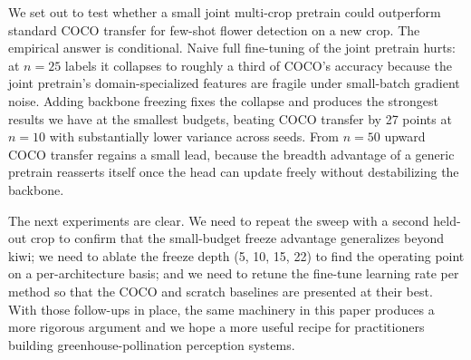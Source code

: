 We set out to test whether a small joint multi-crop pretrain could outperform standard COCO transfer for few-shot flower detection on a new crop. The empirical answer is conditional. Naive full fine-tuning of the joint pretrain hurts: at $n{=}25$ labels it collapses to roughly a third of COCO's accuracy because the joint pretrain's domain-specialized features are fragile under small-batch gradient noise. Adding backbone freezing fixes the collapse and produces the strongest results we have at the smallest budgets, beating COCO transfer by 27 points at $n{=}10$ with substantially lower variance across seeds. From $n{=}50$ upward COCO transfer regains a small lead, because the breadth advantage of a generic pretrain reasserts itself once the head can update freely without destabilizing the backbone.

The next experiments are clear. We need to repeat the sweep with a second held-out crop to confirm that the small-budget freeze advantage generalizes beyond kiwi; we need to ablate the freeze depth (5, 10, 15, 22) to find the operating point on a per-architecture basis; and we need to retune the fine-tune learning rate per method so that the COCO and scratch baselines are presented at their best. With those follow-ups in place, the same machinery in this paper produces a more rigorous argument and we hope a more useful recipe for practitioners building greenhouse-pollination perception systems.
